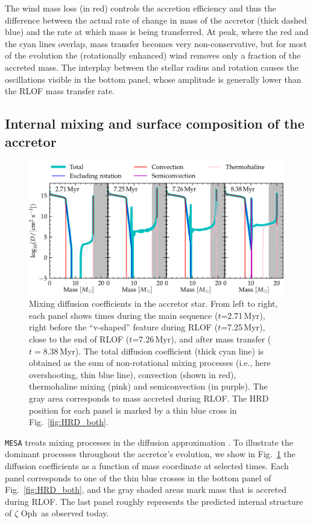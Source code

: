 \documentclass[twocolumn,twocolappendix,trackchanges]{aastex63}
\DeclareRobustCommand{\Figref}[1]{Fig.~\ref{#1}}
\newcommand{\zoph}{$\zeta$ Oph}
\begin{document}
The wind mass loss (in red) controls the accretion efficiency and thus
the difference between the actual rate of change in mass of the
accretor (thick dashed blue) and the rate at which mass is being
transferred. At peak, where the red and the cyan lines overlap, mass
transfer becomes very non-conservative, but for most of the evolution
the (rotationally enhanced) wind removes only a fraction of the
accreted mass. The interplay between the stellar radius and rotation
causes the oscillations visible in the bottom panel, whose amplitude
is generally lower than the RLOF mass transfer rate.

\subsection{Internal mixing and surface composition of the accretor}
\label{sec:mixing}

\begin{figure}[htbp]
  \includegraphics[width=\textwidth]{D_mix}
  \caption{Mixing diffusion coefficients in the accretor star. From
    left to right, each panel shows times during the main sequence
    ($t$=2.71\,Myr), right before the ``v-shaped'' feature during RLOF
    ($t$=7.25\,Myr), close to the end of RLOF ($t$=7.26\,Myr), and
    after mass transfer ($t=8.38$\,Myr). The total diffusion
    coefficient (thick cyan line) is obtained as the sum of
    non-rotational mixing processes (i.e., here overshooting, thin
    blue line), convection (shown in red), thermohaline mixing (pink)
    and semiconvection (in purple). The gray area corresponds to mass
    accreted during RLOF. The HRD position for each panel is marked by
    a thin blue cross in \Figref{fig:HRD_both}.}
  \label{fig:D_mix}
\end{figure}

\texttt{MESA} treats mixing processes in the diffusion approximation \citep{paxton:11}.
To illustrate the dominant processes throughout the
accretor's evolution, we show in \Figref{fig:D_mix} the diffusion
coefficients as a function of mass coordinate at selected times. Each
panel corresponds to one of the thin blue crosses in the bottom panel
of \Figref{fig:HRD_both}, and the gray shaded areas mark mass that is
accreted during RLOF. The last panel roughly represents the predicted
internal structure of \zoph\ as observed today.
\end{document}
